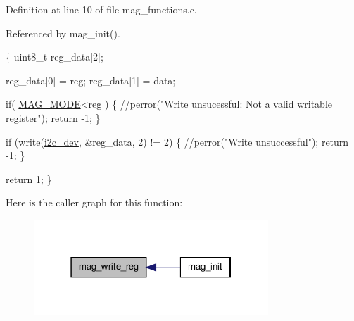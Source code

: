 Definition at line 10 of file mag\-\_\-functions.\-c.



Referenced by mag\-\_\-init().


\begin{DoxyCode}
\{
  uint8\_t reg\_data[2];

  reg\_data[0] = reg;
  reg\_data[1] = data;

  \textcolor{keywordflow}{if}( \hyperlink{communication_2imu__regs_8h_a0173afba6efc0e164495bf506a9758d2}{MAG\_MODE}<reg )
  \{
      \textcolor{comment}{//perror("Write unsucessful: Not a valid writable register");}
      \textcolor{keywordflow}{return} -1;
  \}
        
  \textcolor{keywordflow}{if} (write(\hyperlink{CommunicationV0_2communication_8c_a7751bd45ac1064efb35adf1f19c25db8}{i2c\_dev}, &reg\_data, 2) != 2) \{                
          \textcolor{comment}{//perror("Write unsuccessful");}
          \textcolor{keywordflow}{return} -1;
  \}

  \textcolor{keywordflow}{return} 1;
\}
\end{DoxyCode}


Here is the caller graph for this function\-:\nopagebreak
\begin{figure}[H]
\begin{center}
\leavevmode
\includegraphics[width=250pt]{group__mag_gab5d0ae421cd4bb10b1b7a1eda167416b_icgraph}
\end{center}
\end{figure}


